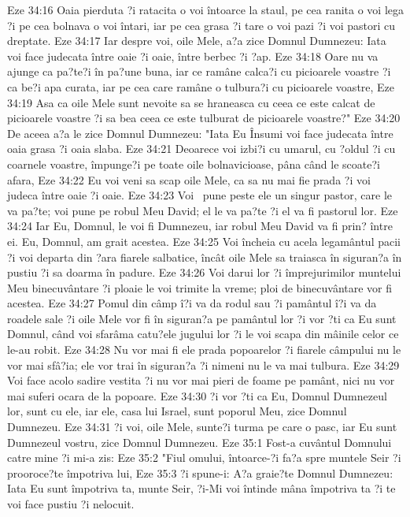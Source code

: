 Eze 34:16  Oaia pierduta ?i ratacita o voi întoarce la staul, pe cea ranita o voi lega ?i pe cea bolnava o voi întari, iar pe cea grasa ?i tare o voi pazi ?i voi pastori cu dreptate.
Eze 34:17  Iar despre voi, oile Mele, a?a zice Domnul Dumnezeu: Iata voi face judecata între oaie ?i oaie, între berbec ?i ?ap.
Eze 34:18  Oare nu va ajunge ca pa?te?i în pa?une buna, iar ce ramâne calca?i cu picioarele voastre ?i ca be?i apa curata, iar pe cea care ramâne o tulbura?i cu picioarele voastre,
Eze 34:19  Asa ca oile Mele sunt nevoite sa se hraneasca cu ceea ce este calcat de picioarele voastre ?i sa bea ceea ce este tulburat de picioarele voastre?"
Eze 34:20  De aceea a?a le zice Domnul Dumnezeu: "Iata Eu Însumi voi face judecata între oaia grasa ?i oaia slaba.
Eze 34:21  Deoarece voi izbi?i cu umarul, cu ?oldul ?i cu coarnele voastre, împunge?i pe toate oile bolnavicioase, pâna când le scoate?i afara,
Eze 34:22  Eu voi veni sa scap oile Mele, ca sa nu mai fie prada ?i voi judeca între oaie ?i oaie.
Eze 34:23  Voi  pune peste ele un singur pastor, care le va pa?te; voi pune pe robul Meu David; el le va pa?te ?i el va fi pastorul lor.
Eze 34:24  Iar Eu, Domnul, le voi fi Dumnezeu, iar robul Meu David va fi prin? între ei. Eu, Domnul, am grait acestea.
Eze 34:25  Voi încheia cu acela legamântul pacii ?i voi departa din ?ara fiarele salbatice, încât oile Mele sa traiasca în siguran?a în pustiu ?i sa doarma în padure.
Eze 34:26  Voi darui lor ?i împrejurimilor muntelui Meu binecuvântare ?i ploaie le voi trimite la vreme; ploi de binecuvântare vor fi acestea.
Eze 34:27  Pomul din câmp î?i va da rodul sau ?i pamântul î?i va da roadele sale ?i oile Mele vor fi în siguran?a pe pamântul lor ?i vor ?ti ca Eu sunt Domnul, când voi sfarâma catu?ele jugului lor ?i le voi scapa din mâinile celor ce le-au robit.
Eze 34:28  Nu vor mai fi ele prada popoarelor ?i fiarele câmpului nu le vor mai sfâ?ia; ele vor trai în siguran?a ?i nimeni nu le va mai tulbura.
Eze 34:29  Voi face acolo sadire vestita ?i nu vor mai pieri de foame pe pamânt, nici nu vor mai suferi ocara de la popoare.
Eze 34:30  ?i vor ?ti ca Eu, Domnul Dumnezeul lor, sunt cu ele, iar ele, casa lui Israel, sunt poporul Meu, zice Domnul Dumnezeu.
Eze 34:31  ?i voi, oile Mele, sunte?i turma pe care o pasc, iar Eu sunt Dumnezeul vostru, zice Domnul Dumnezeu.
Eze 35:1  Fost-a cuvântul Domnului catre mine ?i mi-a zis:
Eze 35:2  "Fiul omului, întoarce-?i fa?a spre muntele Seir ?i prooroce?te împotriva lui,
Eze 35:3  ?i spune-i: A?a graie?te Domnul Dumnezeu: Iata Eu sunt împotriva ta, munte Seir, ?i-Mi voi întinde mâna împotriva ta ?i te voi face pustiu ?i nelocuit.
